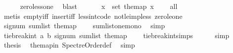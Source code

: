\begin{isabellebody}
\ \ \ \ \isamarkupfalse%
\ zero{\isacharunderscore}{\kern0pt}less{\isacharunderscore}{\kern0pt}one\ \isamarkupfalse%
\ blast\ \isanewline
\ \ \isamarkupfalse%
\ \isamarkupfalse%
\ {\isachardoublequoteopen}{\isasymforall}x\ {\isasymin}\ set\ the{\isacharunderscore}{\kern0pt}map{\isachardot}{\kern0pt}\ x\ {\isasymge}\ {}{\isachardoublequoteclose}\ \isamarkupfalse%
\ all{}{}\isanewline
\ \ \ \ \isamarkupfalse%
\ {\isacharparenleft}{\kern0pt}metis\ empty{\isacharunderscore}{\kern0pt}iff\ insert{\isacharunderscore}{\kern0pt}iff\ less{\isacharunderscore}{\kern0pt}int{\isacharunderscore}{\kern0pt}code{\isacharparenleft}{\kern0pt}{}{\isacharparenright}{\kern0pt}\ not{\isacharunderscore}{\kern0pt}le{\isacharunderscore}{\kern0pt}imp{\isacharunderscore}{\kern0pt}less\ zero{\isacharunderscore}{\kern0pt}le{\isacharunderscore}{\kern0pt}one{\isacharparenright}{\kern0pt}\ \isanewline
\ \ \isamarkupfalse%
\ \isamarkupfalse%
\ {\isachardoublequoteopen}signum\ {\isacharparenleft}{\kern0pt}sum{\isacharunderscore}{\kern0pt}list\ the{\isacharunderscore}{\kern0pt}map{\isacharparenright}{\kern0pt}\ {\isacharequal}{\kern0pt}\ {}{\isachardoublequoteclose}\ \isamarkupfalse%
\ sumlist{\isacharunderscore}{\kern0pt}one{\isacharunderscore}{\kern0pt}mono\ \isamarkupfalse%
\ simp\isanewline
\ \ \isamarkupfalse%
\ \isamarkupfalse%
\ {\isachardoublequoteopen}tie{\isacharunderscore}{\kern0pt}break{\isacharunderscore}{\kern0pt}int\ a\ b\ {\isacharparenleft}{\kern0pt}signum\ {\isacharparenleft}{\kern0pt}sum{\isacharunderscore}{\kern0pt}list\ the{\isacharunderscore}{\kern0pt}map{\isacharparenright}{\kern0pt}{\isacharparenright}{\kern0pt}\ {\isacharequal}{\kern0pt}\ {}{\isachardoublequoteclose}\ \isamarkupfalse%
\ tie{\isacharunderscore}{\kern0pt}break{\isacharunderscore}{\kern0pt}int{\isachardot}{\kern0pt}simps\isanewline
\ \ \ \ \isamarkupfalse%
\ simp\isanewline
\ \ \isamarkupfalse%
\ \isamarkupfalse%
\ {\isacharquery}{\kern0pt}thesis\ \isamarkupfalse%
\ the{\isacharunderscore}{\kern0pt}map{\isacharunderscore}{\kern0pt}in\ Spectre{\isacharunderscore}{\kern0pt}Order{\isacharunderscore}{\kern0pt}def\ \isamarkupfalse%
\ simp\ \ \isanewline
{}\isamarkupfalse%
%
\endisatagproof
{\isafoldproof}%
%
\isadelimproof

\end{isabellebody}
